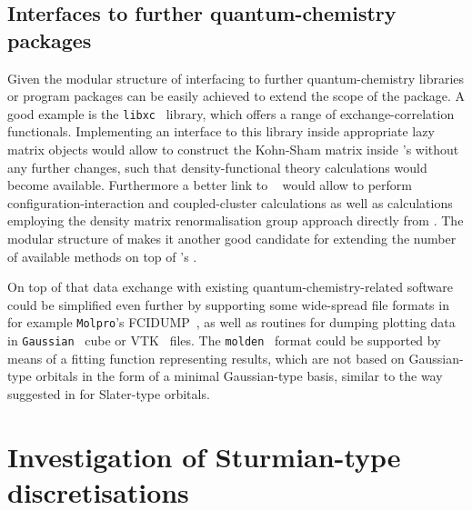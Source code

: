 \subsection{Interfaces to further quantum-chemistry packages}
\label{sec:ExtensionInterfaces}
Given the modular structure of \molsturm
interfacing to further quantum-chemistry libraries or program packages
can be easily achieved to extend the scope of the package.
A good example is the \texttt{libxc}~\cite{Lehtola2018} library,
which offers a range of exchange-correlation functionals.
Implementing an interface to this library inside appropriate
lazy matrix objects would allow to construct the Kohn-Sham matrix
inside \molsturm's \SCF without any further changes,
such that density-functional theory calculations would become available.
Furthermore a better link to \pyscf~\cite{Sun2017}
would allow to perform configuration-interaction
and coupled-cluster calculations as well as calculations
employing the density matrix renormalisation group approach
directly from \molsturm.
The modular structure of \psifour makes it another good candidate
for extending the number of available methods
on top of \molsturm's \SCF.

On top of that data exchange with existing quantum-chemistry-related software
could be simplified even further by supporting
some wide-spread file formats in \molsturm
for example \texttt{Molpro}'s FCIDUMP~\cite{Knowles1989},
as well as routines for dumping plotting data
in \texttt{Gaussian}~\cite{Frisch2016} cube or VTK~\cite{Avila2010} files.
The \texttt{molden}~\cite{Schaftenaar2000} format
could be supported by means of a fitting function
representing results,
which are not based on Gaussian-type orbitals in the form of a minimal
Gaussian-type basis,
similar to the way suggested in \cite{Stewart1970}
for Slater-type orbitals.


\section{Investigation of Sturmian-type discretisations}
\label{sec:newSturmian}

